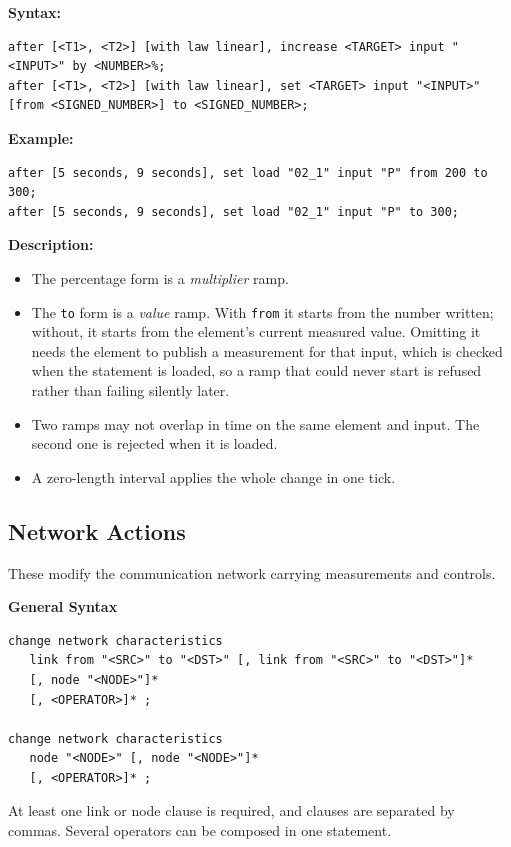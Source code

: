\documentclass[12pt]{article}
\begin{document}
\textbf{Syntax:}
\begin{lstlisting}
after [<T1>, <T2>] [with law linear], increase <TARGET> input "<INPUT>" by <NUMBER>%;
after [<T1>, <T2>] [with law linear], set <TARGET> input "<INPUT>" [from <SIGNED_NUMBER>] to <SIGNED_NUMBER>;
\end{lstlisting}

\textbf{Example:}
\begin{lstlisting}
after [5 seconds, 9 seconds], set load "02_1" input "P" from 200 to 300;
after [5 seconds, 9 seconds], set load "02_1" input "P" to 300;
\end{lstlisting}

\textbf{Description:}
\begin{itemize}
  \item The percentage form is a \emph{multiplier} ramp.
  \item The \texttt{to} form is a \emph{value} ramp. With \texttt{from} it starts from the number written; without, it starts from the element's current measured value. Omitting it needs the element to publish a measurement for that input, which is checked when the statement is loaded, so a ramp that could never start is refused rather than failing silently later.
  \item Two ramps may not overlap in time on the same element and input. The second one is rejected when it is loaded.
  \item A zero-length interval applies the whole change in one tick.
\end{itemize}

\subsection{Network Actions}

These modify the communication network carrying measurements and controls.

\textbf{General Syntax}

\begin{lstlisting}
change network characteristics
   link from "<SRC>" to "<DST>" [, link from "<SRC>" to "<DST>"]*
   [, node "<NODE>"]*
   [, <OPERATOR>]* ;

change network characteristics
   node "<NODE>" [, node "<NODE>"]*
   [, <OPERATOR>]* ;
\end{lstlisting}

At least one link or node clause is required, and clauses are separated by commas. Several operators can be composed in one statement.
\end{document}
